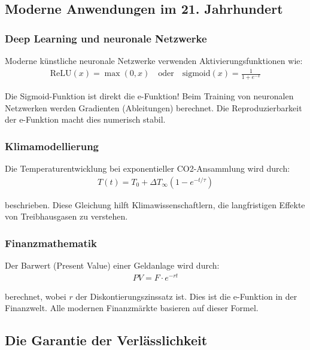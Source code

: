 \documentclass[a4paper, 12pt, twoside, openright]{report}
\theoremstyle{definition}
\theoremstyle{definition}
\begin{document}
\subsection{Moderne Anwendungen im 21. Jahrhundert}

\subsubsection*{Deep Learning und neuronale Netzwerke}

Moderne künstliche neuronale Netzwerke verwenden Aktivierungsfunktionen wie:
\begin{align}
	\text{ReLU}(x) = \max(0, x) \quad \text{oder} \quad \text{sigmoid}(x) = \frac{1}{1 + e^{-x}}
\end{align}

Die Sigmoid-Funktion ist direkt die e-Funktion! Beim Training von neuronalen Netzwerken werden Gradienten (Ableitungen) berechnet. Die Reproduzierbarkeit der e-Funktion macht dies numerisch stabil.

\subsubsection*{Klimamodellierung}

Die Temperaturentwicklung bei exponentieller CO2-Ansammlung wird durch:
\begin{align}
	T(t) = T_0 + \Delta T_{\infty} (1 - e^{-t/\tau})
\end{align}

beschrieben. Diese Gleichung hilft Klimawissenschaftlern, die langfristigen Effekte von Treibhausgasen zu verstehen.

\subsubsection*{Finanzmathematik}

Der Barwert (Present Value) einer Geldanlage wird durch:
\begin{align}
	PV = F \cdot e^{-rt}
\end{align}

berechnet, wobei $r$ der Diskontierungszinssatz ist. Dies ist die e-Funktion in der Finanzwelt. Alle modernen Finanzmärkte basieren auf dieser Formel.

\subsection{Die Garantie der Verlässlichkeit}
\end{document}
